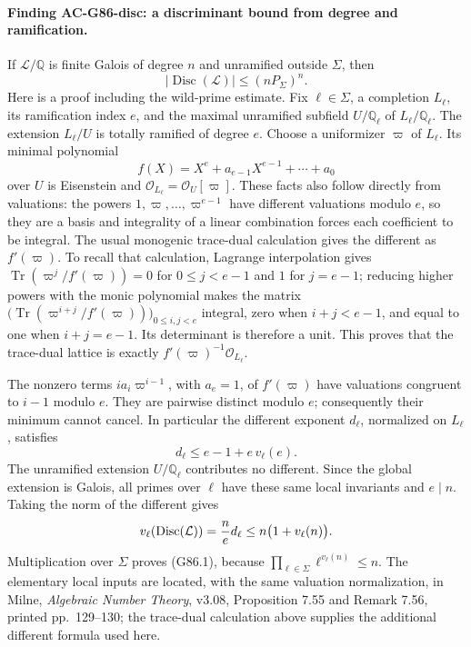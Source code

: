 \paragraph{Finding AC-G86-disc: a discriminant bound from degree and ramification.}
If \(\mathcal L/\mathbb Q\) is finite Galois of degree \(n\) and unramified outside \(\Sigma\), then
\[
 |\operatorname{Disc}(\mathcal L)|\leq (nP_\Sigma)^n. \tag{G86.1}
\]
Here is a proof including the wild-prime estimate. Fix \(\ell\in\Sigma\), a completion \(L_\ell\), its ramification index \(e\), and the maximal unramified subfield \(U/\mathbb Q_\ell\) of \(L_\ell/\mathbb Q_\ell\). The extension \(L_\ell/U\) is totally ramified of degree \(e\). Choose a uniformizer \(\varpi\) of \(L_\ell\). Its minimal polynomial
\[
 f(X)=X^e+a_{e-1}X^{e-1}+\cdots+a_0
\]
over \(U\) is Eisenstein and \(\mathcal O_{L_\ell}=\mathcal O_U[\varpi]\). These facts also follow directly from valuations: the powers \(1,\varpi,\ldots,\varpi^{e-1}\) have different valuations modulo \(e\), so they are a basis and integrality of a linear combination forces each coefficient to be integral. The usual monogenic trace-dual calculation gives the different as \(f'(\varpi)\). To recall that calculation, Lagrange interpolation gives
\(\operatorname{Tr}(\varpi^j/f'(\varpi))=0\) for \(0\leq j<e-1\) and \(1\) for \(j=e-1\); reducing higher powers with the monic polynomial makes the matrix \(\bigl(\operatorname{Tr}(\varpi^{i+j}/f'(\varpi))\bigr)_{0\leq i,j<e}\) integral, zero when \(i+j<e-1\), and equal to one when \(i+j=e-1\). Its determinant is therefore a unit. This proves that the trace-dual lattice is exactly \(f'(\varpi)^{-1}\mathcal O_{L_\ell}\).

The nonzero terms \(i a_i\varpi^{i-1}\), with \(a_e=1\), of \(f'(\varpi)\) have valuations congruent to \(i-1\) modulo \(e\). They are pairwise distinct modulo \(e\); consequently their minimum cannot cancel. In particular the different exponent \(d_\ell\), normalized on \(L_\ell\), satisfies
\[
 d_\ell\leq e-1+e\,v_\ell(e).
\]
The unramified extension \(U/\mathbb Q_\ell\) contributes no different. Since the global extension is Galois, all primes over \(\ell\) have these same local invariants and \(e\mid n\). Taking the norm of the different gives
\[
 v_\ell(\operatorname{Disc}(\mathcal L))
   ={n\over e}d_\ell
   \leq n\bigl(1+v_\ell(n)\bigr).
\]
Multiplication over \(\Sigma\) proves (G86.1), because
\(\prod_{\ell\in\Sigma}\ell^{v_\ell(n)}\leq n\).
The elementary local inputs are located, with the same valuation normalization, in Milne, \emph{Algebraic Number Theory}, v3.08, Proposition 7.55 and Remark 7.56, printed pp.\ 129--130; the trace-dual calculation above supplies the additional different formula used here.

